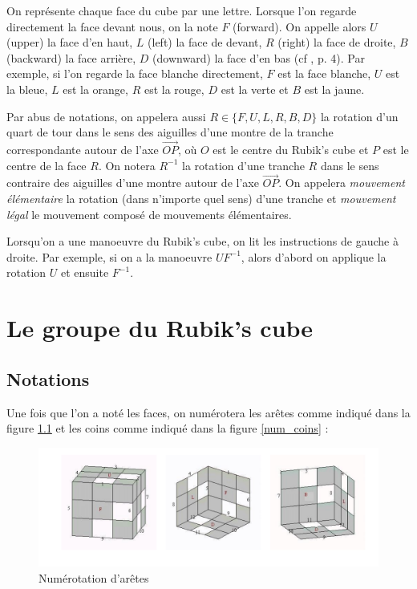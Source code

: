 \documentclass[french]{report}
\begin{document}
On représente chaque face du cube par une lettre. Lorsque l'on regarde directement la face devant nous, on la note $F$ (forward). On appelle alors $U$ (upper) la face d'en haut, $L$ (left) la face de devant, $R$ (right) la face de droite, $B$ (backward) la face arrière, $D$ (downward) la face d'en bas (cf \cite{singmaster}, p. 4). Par exemple, si l'on regarde la face blanche directement, $F$ est la face blanche, $U$ est la bleue, $L$ est la orange, $R$ est la rouge, $D$ est la verte et $B$ est la jaune.


Par abus de notations, on appelera aussi  $R \in \{ F, U, L, R, B, D \} $ la rotation d'un quart de tour dans le sens des aiguilles d'une montre de la tranche correspondante autour de l'axe $\overrightarrow{ O P } $, où $O$ est le centre du Rubik's cube et $P$ est le centre de la face $R$. On notera $R ^{-1} $ la rotation d'une tranche $R$ dans le sens contraire des aiguilles d'une montre autour de l'axe $\overrightarrow{ OP } $. On appelera \emph{mouvement élémentaire} la rotation (dans n'importe quel sens) d'une tranche et \emph{mouvement légal} le mouvement composé de mouvements élémentaires.

Lorsqu'on a une manoeuvre du Rubik's cube, on lit les instructions de gauche à droite. Par exemple, si on a la manoeuvre $UF ^{-1} $, alors d'abord on applique la rotation $U$ et ensuite $F ^{-1} $.

\chapter{Le groupe du Rubik's cube} \label{chap_groupe_rubik}


\section*{Notations}

Une fois que l'on a noté les faces, on numérotera les arêtes comme indiqué dans la figure \ref{num_aretes} et les coins comme indiqué dans la figure \ref{num_coins} :

\begin{figure}[h!]
  \centering
  \includegraphics[scale=0.2]{figures/num_aretes.png}
  \caption{Numérotation d'arêtes}
  \label{num_aretes}
\end{figure}
\end{document}
